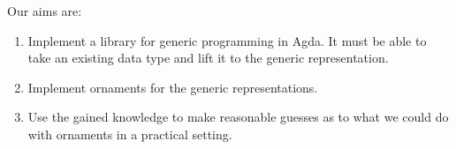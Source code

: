 Our aims are:

\begin{enumerate}
\item Implement a library for generic programming in Agda.
  It must be able to take an existing data type and lift it to the
  generic representation.
\item Implement ornaments for the generic representations.
\item Use the gained knowledge to make reasonable guesses as to what
  we could do with ornaments in a practical setting.
\end{enumerate}


